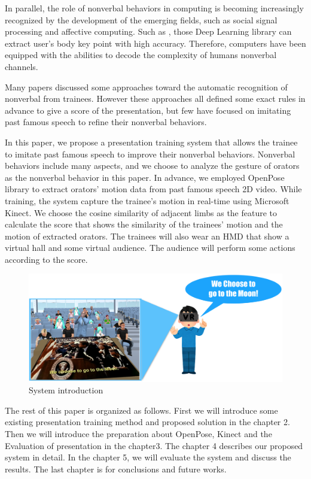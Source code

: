 \par In parallel, the role of nonverbal behaviors in computing is becoming increasingly recognized by the development of the emerging fields, such as social signal processing and affective computing. Such as \cite{Chen,cao2017realtime,Fang2016,Papandreou2017,He2017}, those Deep Learning library can extract user's body key point with high accuracy. Therefore, computers have been equipped with the abilities to decode the complexity of humans nonverbal channels. 

\par Many papers discussed some approaches toward the automatic recognition of nonverbal from trainees. However these approaches all defined some exact rules in advance to give a score of the presentation, but few have focused on imitating past famous speech to refine their nonverbal behaviors. 
 
\par In this paper, we propose a presentation training system that allows the trainee to imitate past famous speech to improve their nonverbal behaviors. Nonverbal behaviors include many aspects, and we choose to analyze the gesture of orators as the nonverbal behavior in this paper. In advance, we employed OpenPose library\cite{cao2017realtime} to extract orators' motion data from past famous speech 2D video. While training, the system capture the trainee's motion in real-time using Microsoft Kinect. We choose the cosine similarity of adjacent limbs as the feature to calculate the score that shows the similarity of the trainees' motion and the motion of extracted orators. The trainees will also wear an HMD that show a virtual hall and some virtual audience. The audience will perform some actions according to the score.
\begin{figure}[htbp]
\centering\includegraphics[scale=0.225]{./img/Introduction.png}
\caption{System introduction}\label{fig:System introduction}
\end{figure}

\par The rest of this paper is organized as follows. First we will introduce some existing presentation training method and proposed solution in the chapter 2. Then we will introduce the preparation about OpenPose, Kinect and the Evaluation of presentation in the chapter3. The chapter 4 describes our proposed system in detail. In the chapter 5, we will evaluate the system and discuss the results. The last chapter is for conclusions and future works.
